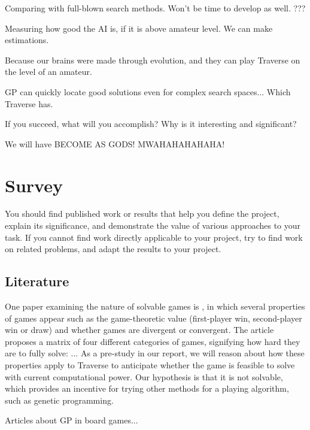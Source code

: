 \documentclass[times, 10pt,twocolumn]{article}
\begin{document}
Comparing with full-blown search methods. Won't be time to develop as well. ???

Measuring how good the AI is, if it is above amateur level. We can make estimations.


Because our brains were made through evolution, and they can play Traverse on the level of an amateur.

GP can quickly locate good solutions even for complex search spaces... Which Traverse has.


If you succeed, what will you accomplish? Why is it interesting and significant?

We will have BECOME AS GODS! MWAHAHAHAHAHA!


\section{Survey}
You should find published work or results that help you define the project, explain its significance, and demonstrate the value of various approaches to your task. If you cannot find work directly applicable to your project, try to find work on related problems, and adapt the results to your project.

\subsection{Literature}
One paper examining the nature of solvable games is \cite{games_solved}, in which several properties of games appear such as the game-theoretic value (first-player win, second-player win or draw) and whether games are divergent or convergent. The article proposes a matrix of four different categories of games, signifying how hard they are to fully solve: ... As a pre-study in our report, we will reason about how these properties apply to Traverse to anticipate whether the game is feasible to solve with current computational power. Our hypothesis is that it is not solvable, which provides an incentive for trying other methods for a playing algorithm, such as genetic programming.

Articles about GP in board games...
\end{document}
